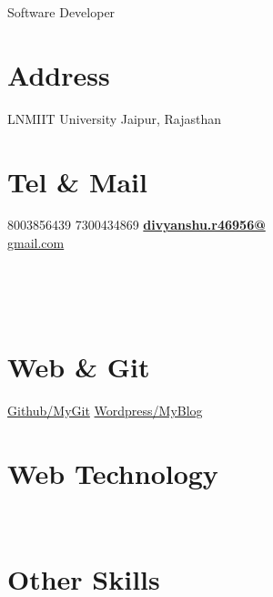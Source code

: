 \documentclass[]{friggeri-cv}
\begin{document}
      {Software Developer}
      

\begin{aside}
\hspace
\hspace
\hspace
\hspace
\hspace
\hspace
\hspace
  \section{Address}
    LNMIIT University
    Jaipur, Rajasthan
    ~
  \section{Tel \& Mail}
    8003856439
    7300434869
     \href{mailto:divyanshu.r46956@gmail.com}{\textbf{divyanshu.r46956@}\\gmail.com}
    
    ~
   
    ~
  \section{Web \& Git}
    \href{https://github.com/divyanshu-rawat}{Github/MyGit}
    \href{https://divyanshu0001.wordpress.com/}{Wordpress/MyBlog}
    ~
  \section{Web Technology}
    ~
  \section{Other Skills}
    ~
\end{aside}
~
\end{document}
